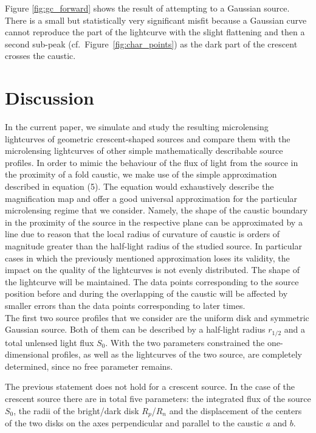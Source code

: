 \documentclass[usenatbib]{mn2e}
\begin{document}
Figure \ref{fig:gc_forward} shows the result of attempting to a
Gaussian source.  There is a small but statistically very significant
misfit because a Gaussian curve cannot reproduce the part of the
lightcurve with the slight flattening and then a second sub-peak
(cf.~Figure~\ref{fig:char_points}) as the dark part of the crescent
crosses the caustic.

\section{Discussion}\label{sec:discussion}

In the current paper, we simulate and study the resulting microlensing lightcurves of geometric crescent-shaped sources 
and compare them with the microlensing lightcurves of other simple mathematically describable source profiles. 
In order to mimic the behaviour of the flux of light from the source in the proximity of a fold caustic, we make use of the simple approximation described in equation (5). 
The equation would exhaustively describe the magnification map and offer a good universal approximation for the 
particular microlensing regime that we consider. 
Namely, the shape of the caustic boundary in the proximity of the source in the respective plane can be approximated by
 a line due to reason that the local radius of curvature of caustic is orders of magnitude greater than the half-light
 radius of the studied source. 
In particular cases in which the previously mentioned approximation loses its validity, the impact on the quality of the 
lightcurves is not evenly distributed. The shape of the lightcurve will be maintained. 
The data points corresponding to the source position before and during the overlapping of the caustic will be affected by
 smaller errors than the data points corresponding to later times. \\

The first two source profiles that we consider are the uniform disk and symmetric Gaussian source. 
Both of them can be described by a half-light radius $r_{1/2}$ and a total unlensed light flux $S_0$. 
With the two parameters constrained the one-dimensional profiles, as well as the lightcurves of the two source, are completely determined, since no free parameter remains. 

The previous statement does not hold for a crescent source.
In the case of the crescent source there are in total five parameters: the integrated flux of the source $S_0$,
 the radii of the bright/dark disk $R_p$/$R_n$ and the displacement of the centers of the two disks on the axes perpendicular and parallel to the caustic $a$ and $b$. 
\end{document}
